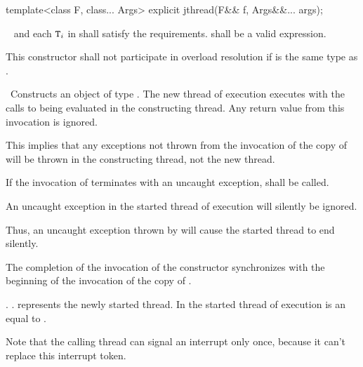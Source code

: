 %
\begin{itemdecl}
template<class F, class... Args> explicit jthread(F&& f, Args&&... args);
\end{itemdecl}
\begin{itemdescr}
  \pnum
\requires\  and each $\texttt{T}_i$ in  shall satisfy the
 requirements.
 shall be
a valid expression.

\pnum\remarks
This constructor shall not participate in overload resolution if 
is the same type as .

\pnum\effects\ Constructs an object of type . The new thread of execution executes
 with the calls to
 being evaluated in the constructing thread. Any return value from this invocation
is ignored. \begin{note} This implies that any exceptions not thrown from the invocation of the copy
of  will be thrown in the constructing thread, not the new thread. \end{note} If the
invocation of
termi\-nates with an uncaught exception,  shall be called.

{\color{diffcolor}
An uncaught  exception in the started thread of execution
will silently be ignored.
\begin{note} Thus, an uncaught exception thrown by 
             will cause the started thread to end silently.
             \end{note}
}%

\pnum\sync The completion of the invocation of the constructor
synchronizes with the beginning of the invocation of the copy of .

{\color{diffcolor}
\pnum\postconditions {}.
                     .
                      represents the newly started thread.
                     In the started thread of execution 
                     is an  equal to . 
\begin{note} Note that the calling thread can signal an interrupt only once,
                because it can't replace this interrupt token.  \end{note}
}%


\end{itemdescr}

